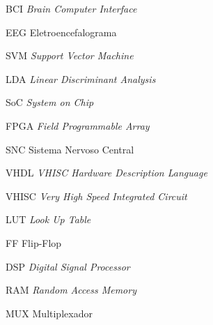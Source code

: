 \begin{siglas}
  \item[BCI] \textit{Brain Computer Interface}
  \item[EEG] Eletroencefalograma
  \item[SVM] \textit{Support Vector Machine}
  \item[LDA] \textit{Linear Discriminant Analysis}
  \item[SoC] \textit{System on Chip}
  \item[FPGA] \textit{Field Programmable Array}
  \item[SNC] Sistema Nervoso Central
  \item[VHDL] \textit{VHISC Hardware Description Language}
  \item[VHISC] \textit{Very High Speed Integrated Circuit}
  \item[LUT] \textit{Look Up Table}
  \item[FF] Flip-Flop
  \item[DSP] \textit{Digital Signal Processor}
  \item[RAM] \textit{Random Access Memory}
  \item[MUX] Multiplexador
  

\end{siglas}
